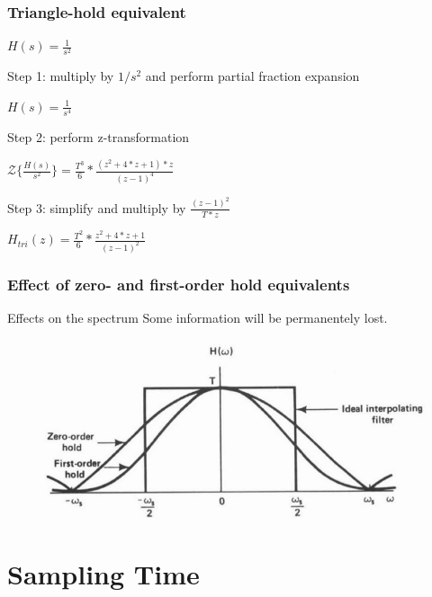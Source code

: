 \begin{frame}
	\frametitle{Triangle-hold equivalent}
	\begin{example}
		\begin{center}
			$H(s) = \frac{1}{s^{2}}$
		\end{center}
		Step 1: multiply by $1/s^{2}$ and perform partial fraction expansion
		\begin{center}
			$H(s) = \frac{1}{s^{4}}$
		\end{center}
		Step 2: perform z-transformation
		\begin{center}
			$\mathcal{Z}\{\frac{H(s)}{s^{2}}\} = \frac{T^{3}}{6} * \frac{(z^{2} + 4*z +1) * z}{(z-1)^{4}}$
		\end{center}
		Step 3: simplify and multiply by $\frac{(z-1)^{2}}{T*z}$
		\begin{center}
			$H_{tri}(z) = \frac{T^{2}}{6} * \frac{z^{2} + 4*z + 1}{(z-1)^{2}}$
		\end{center}
	\end{example}
\end{frame}

\begin{frame}
	\frametitle{Effect of zero- and first-order hold equivalents}
	\begin{block}{Effects on the spectrum}
		Some information will be permanentely lost.
		\vspace{-0.7em}
		\begin{figure}
			\centering
			\includegraphics[width=1\linewidth]{effect_zoh_foh}
		\end{figure}
	\end{block}
\end{frame}

\section{Sampling Time}

